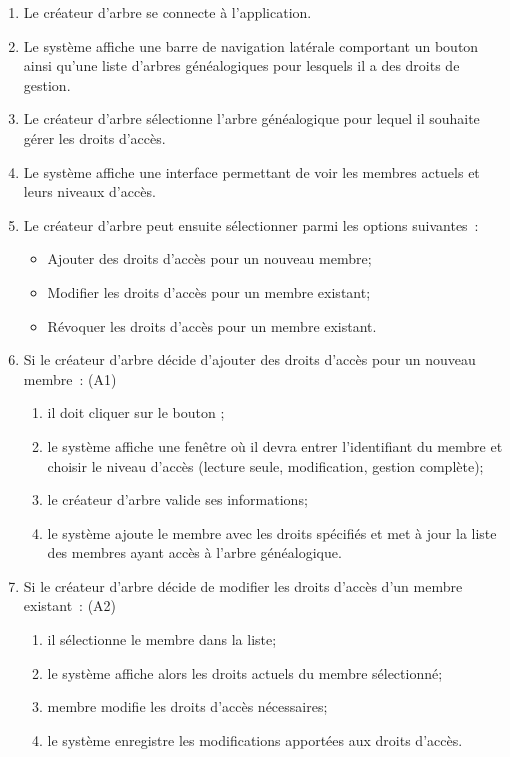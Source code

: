 \begin{enumerate}

  \item  Le créateur d'arbre se connecte à l’application.

  \item Le système affiche une barre de navigation latérale comportant un
    bouton  ainsi qu’une liste d’arbres
    généalogiques pour lesquels il a des droits de gestion.

  \item Le créateur d'arbre sélectionne l'arbre généalogique pour lequel il souhaite
    gérer les droits d'accès.

  \item Le système affiche une interface permettant de voir les membres
    actuels et leurs niveaux d'accès.

  \item Le créateur d'arbre peut ensuite sélectionner parmi les options suivantes :
    \begin{itemize}
      \item Ajouter des droits d'accès pour un nouveau membre;
      \item Modifier les droits d'accès pour un membre existant;
      \item Révoquer les droits d'accès pour un membre existant.
    \end{itemize}

  \item Si le créateur d'arbre décide d'ajouter des droits d'accès pour un nouveau membre : (A1)
    \begin{enumerate}
      \item il doit cliquer sur le bouton ;
      \item le système affiche une fenêtre où il devra entrer l'identifiant du
        membre et choisir le niveau d'accès (lecture seule,
        modification, gestion complète);
      \item le créateur d'arbre valide ses informations;
      \item le système ajoute le membre avec les droits spécifiés et met à
        jour la liste des membres ayant accès à l'arbre généalogique.
    \end{enumerate}

  \item Si le créateur d'arbre décide de modifier les droits d'accès d'un membre existant : (A2)
    \begin{enumerate}
      \item il sélectionne le membre dans la liste;
      \item le système affiche alors les droits actuels du membre sélectionné;
      \item membre modifie les droits d'accès nécessaires;
      \item le système enregistre les modifications apportées aux droits d'accès.
    \end{enumerate}


\end{enumerate}
